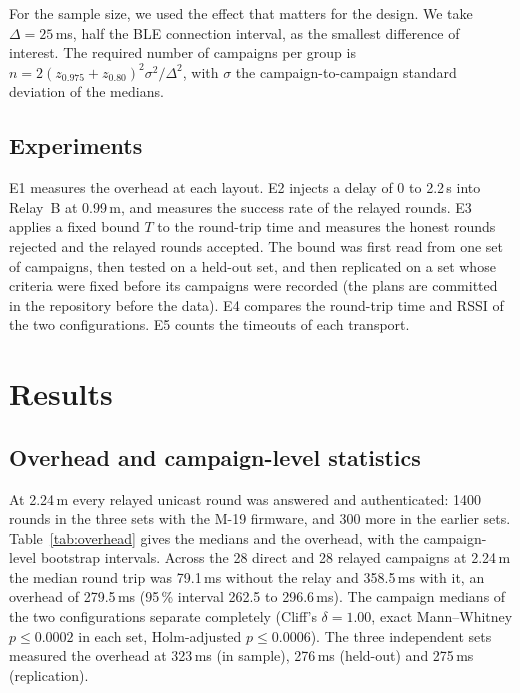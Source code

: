 \documentclass{ieeeaccess}
\begin{document}
For the sample size, we used the effect that matters for the design. We take $\Delta=25$\,ms, half the BLE connection interval, as the smallest difference of interest. The required number of campaigns per group is $n = 2(z_{0.975}+z_{0.80})^2\sigma^2/\Delta^2$, with $\sigma$ the campaign-to-campaign standard deviation of the medians.

\subsection{Experiments}

E1 measures the overhead at each layout. E2 injects a delay of 0 to 2.2\,s into Relay~B at 0.99\,m, and measures the success rate of the relayed rounds. E3 applies a fixed bound $T$ to the round-trip time and measures the honest rounds rejected and the relayed rounds accepted. The bound was first read from one set of campaigns, then tested on a held-out set, and then replicated on a set whose criteria were fixed before its campaigns were recorded (the plans are committed in the repository before the data). E4 compares the round-trip time and RSSI of the two configurations. E5 counts the timeouts of each transport.

\section{Results}
\label{sec:results}

\subsection{Overhead and campaign-level statistics}

At 2.24\,m every relayed unicast round was answered and authenticated: 1400 rounds in the three sets with the M-19 firmware, and 300 more in the earlier sets. Table~\ref{tab:overhead} gives the medians and the overhead, with the campaign-level bootstrap intervals. Across the 28 direct and 28 relayed campaigns at 2.24\,m the median round trip was 79.1\,ms without the relay and 358.5\,ms with it, an overhead of 279.5\,ms (95\,\% interval 262.5 to 296.6\,ms). The campaign medians of the two configurations separate completely (Cliff's $\delta=1.00$, exact Mann--Whitney $p\le 0.0002$ in each set, Holm-adjusted $p\le0.0006$). The three independent sets measured the overhead at 323\,ms (in sample), 276\,ms (held-out) and 275\,ms (replication).
\end{document}
